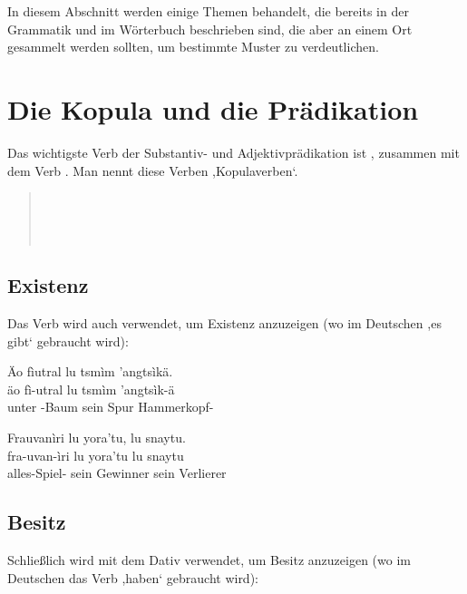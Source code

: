 
In diesem Abschnitt werden einige Themen behandelt, die bereits in der Grammatik und im Wörterbuch beschrieben sind, die aber an einem Ort gesammelt werden sollten, um bestimmte Muster zu verdeutlichen.

\section{Die Kopula und die Prädikation} 
\noindent Das wichtigste Verb der Substantiv- und Adjektivprädikation ist  , zusammen mit dem Verb  . Man nennt diese Verben ,Kopulaverben‘.

\begin{quotation}
\noindent{}  \\
\noindent{}  \\
\noindent{}  \\
\noindent{} 
\end{quotation}

\subsection{Existenz}
Das Verb  wird auch verwendet, um Existenz anzuzeigen (wo im Deutschen ,es gibt‘ gebraucht wird): 

\begin{interlin}
	\glll \Npawl{}Äo fìutral lu tsmìm 'angtsìkä. \\
	äo fì-utral lu tsmìm 'angtsìk-ä \\
	unter -Baum sein Spur Hammerkopf- \\
\end{interlin}

\begin{interlin}
	\glll \Npawl{}Frauvanìri lu yora'tu, lu snaytu. \\
	fra-uvan-ìri lu yora'tu lu snaytu \\
	alles-Spiel- sein Gewinner sein Verlierer \\
\end{interlin}

\subsection{Besitz}
Schließlich wird  mit dem Dativ verwendet, um Besitz anzuzeigen (wo im Deutschen das Verb ,haben‘ gebraucht wird): 

